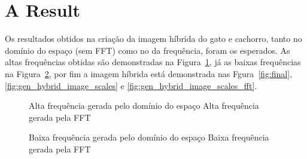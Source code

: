 \section*{A Result}

Os resultados obtidos na criação da imagem híbrida do gato e cachorro, tanto no domínio do espaço (sem FFT) como no da frequência, foram os esperados. As altas frequências obtidas são demonstradas na Figura~\ref{fig:altas}, já as baixas frequências na Figura~\ref{fig:baixas}, por fim a imagem híbrida está demonstrada nas Fgura~\ref{fig:final}, \ref{fig:gen_hybrid_image_scales} e \ref{fig:gen_hybrid_image_scales_fft}.

\begin{figure}[ht]
	\centering
	\caption[]{  Alta frequência gerada pelo domínio do espaço  Alta frequência gerada pela FFT}
	\label{fig:altas}
\end{figure}
 
 \begin{figure}[ht]
 	\centering
 	\caption[]{  Baixa frequência gerada pelo domínio do espaço  Baixa frequência gerada pela FFT}
 	\label{fig:baixas}
 \end{figure}
 
